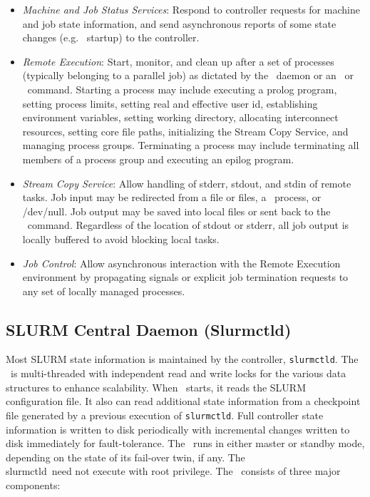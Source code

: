 \begin{itemize}
\item {\em Machine and Job Status Services}:  Respond to controller 
requests for machine and job state information, and send asynchronous 
reports of some state changes (e.g. \slurmd\ startup) to the controller.

\item {\em Remote Execution}: Start, monitor, and clean up after a set
of processes (typically belonging to a parallel job) as dictated by the
\slurmctld\ daemon or an \srun\ or \scancel\ command. Starting a process may
include executing a prolog program, setting process limits, setting real
and effective user id, establishing environment variables, setting working
directory, allocating interconnect resources, setting core file paths,
initializing the Stream Copy Service, and managing
process groups. Terminating a process may include terminating all members
of a process group and executing an epilog program.

\item {\em Stream Copy Service}: Allow handling of stderr, stdout, and
stdin of remote tasks. Job input may be redirected from a file or files, a
\srun\ process, or /dev/null.  Job output may be saved into local files or
sent back to the \srun\ command. Regardless of the location of stdout or stderr,
all job output is locally buffered to avoid blocking local tasks.

\item {\em Job Control}: Allow asynchronous interaction with the
Remote Execution environment by propagating signals or explicit job
termination requests to any set of locally managed processes.

\end{itemize}

\subsection{SLURM Central Daemon (Slurmctld)}

Most SLURM state information is maintained by the controller, {\tt slurmctld}.
The \slurmctld\ is multi-threaded with independent read and write locks 
for the various data structures to enhance scalability. 
When \slurmctld\ starts, it reads the SLURM configuration file.  
It also can read additional state information
from a checkpoint file generated by a previous execution of {\tt slurmctld}.
Full controller state information is written to 
disk periodically with incremental changes written to disk immediately
for fault-tolerance.  
The \slurmctld\ runs in either master or standby mode, depending on the
state of its fail-over twin, if any.
The \\slurmctld\ need not execute with root privilege.
The \slurmctld\ consists of three major components:

